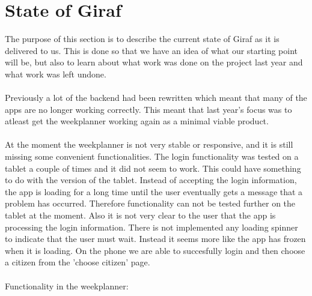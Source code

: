 \section{State of Giraf}
The purpose of this section is to describe the current state of Giraf as it is delivered to us. 
This is done so that we have an idea of what our starting point will be,
but also to learn about what work was done on the project last year and what work was left undone. 
\\\\
Previously a lot of the backend had been rewritten which meant that many of the apps are no longer working correctly. 
This meant that last year's focus was to atleast get the weekplanner working again as a minimal viable product.
\\\\
At the moment the weekplanner is not very stable or responsive, and it is still missing some convenient functionalities. 
The login functionality was tested on a tablet a couple of times and it did not seem to work. This could have something to do with the version of the tablet.
Instead of accepting the login information, the app is loading for a long time until the user eventually gets a message that a problem has occurred. 
Therefore functionality can not be tested further on the tablet at the moment. Also it is not very clear to the user that the app is processing the login information. 
There is not implemented any loading spinner to indicate that the user must wait. Instead it seems more like the app has frozen when it is loading.
On the phone we are able to succesfully login and then choose a citizen from the 'choose citizen' page.
\\\\
Functionality in the weekplanner:

